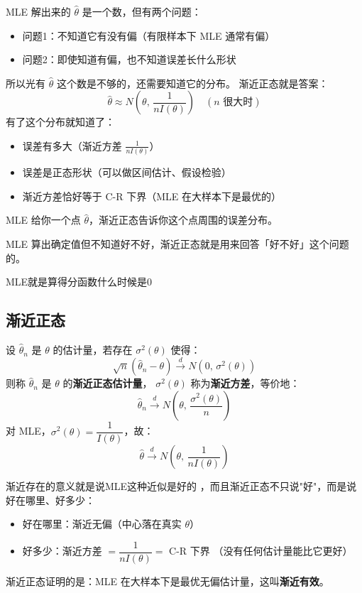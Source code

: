 \begin{note}
    MLE 解出来的 $\hat{\theta}$ 是一个数，但有两个问题：

\begin{itemize}
  \item 问题1：不知道它有没有偏（有限样本下 MLE 通常有偏）
  \item 问题2：即使知道有偏，也不知道误差长什么形状
\end{itemize}

所以光有 $\hat{\theta}$ 这个数是不够的，还需要知道它的分布。
渐近正态就是答案：
$$\hat{\theta} \approx N\!\left(\theta,\, \frac{1}{nI(\theta)}\right) \quad (n \text{ 很大时})$$
有了这个分布就知道了：
\begin{itemize}
  \item 误差有多大（渐近方差 $\frac{1}{nI(\theta)}$）
  \item 误差是正态形状（可以做区间估计、假设检验）
  \item 渐近方差恰好等于 C-R 下界（MLE 在大样本下是最优的）
\end{itemize}

MLE 给你一个点 $\hat{\theta}$，渐近正态告诉你这个点周围的误差分布。

MLE 算出确定值但不知道好不好，渐近正态就是用来回答「好不好」这个问题的。
\end{note}
\begin{dxtips}
    MLE就是算得分函数什么时候是0
\end{dxtips}
\subsection{渐近正态}
\begin{definition}[渐近正态性与渐近方差]
设 $\hat{\theta}_n$ 是 $\theta$ 的估计量，若存在 $\sigma^2(\theta)$ 使得：
$$\sqrt{n}(\hat{\theta}_n - \theta) \xrightarrow{d} N(0,\, \sigma^2(\theta))$$
则称 $\hat{\theta}_n$ 是 $\theta$ 的\textbf{渐近正态估计量}，
$\sigma^2(\theta)$ 称为\textbf{渐近方差}，等价地：
$$\hat{\theta}_n \xrightarrow{d} N\!\left(\theta,\, \frac{\sigma^2(\theta)}{n}\right)$$
对 MLE，$\sigma^2(\theta) = \dfrac{1}{I(\theta)}$，故：
$$\hat{\theta} \xrightarrow{d} N\!\left(\theta,\, \frac{1}{nI(\theta)}\right)$$
\end{definition}
\begin{dxtips}
渐近存在的意义就是说MLE这种近似是好的
    ，而且渐近正态不只说"好"，而是说好在哪里、好多少：
\begin{itemize}
  \item 好在哪里：渐近无偏（中心落在真实 $\theta$）
  \item 好多少：渐近方差 $= \dfrac{1}{nI(\theta)} =$ C-R 下界
        （没有任何估计量能比它更好）
\end{itemize}
渐近正态证明的是：MLE 在大样本下是最优无偏估计量，这叫\textbf{渐近有效}。
\end{dxtips}

